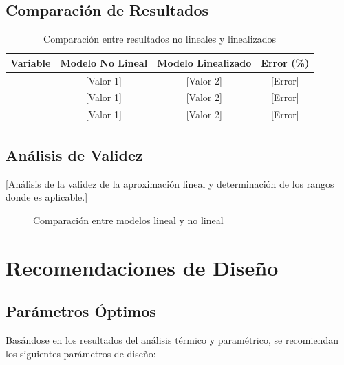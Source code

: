 \documentclass[12pt,letterpaper]{article}
\begin{document}
\subsection{Comparación de Resultados}
\begin{table}[H]
    \centering
    \caption{Comparación entre resultados no lineales y linealizados}
    \label{tab:comparacion_lineal}
    \begin{tabular}{lccc}
        \toprule
        \textbf{Variable} & \textbf{Modelo No Lineal} & \textbf{Modelo Linealizado} & \textbf{Error (\%)} \\
        \midrule
        [Variable 1] & [Valor 1] & [Valor 2] & [Error] \\
        [Variable 2] & [Valor 1] & [Valor 2] & [Error] \\
        [Variable 3] & [Valor 1] & [Valor 2] & [Error] \\
        \bottomrule
    \end{tabular}
\end{table}

\subsection{Análisis de Validez}
[Análisis de la validez de la aproximación lineal y determinación de los rangos donde es aplicable.]

\begin{figure}[H]
    \centering
    \caption{Comparación entre modelos lineal y no lineal}
    \label{fig:comparacion_lineal}
\end{figure}

\newpage
\section{Recomendaciones de Diseño}

\subsection{Parámetros Óptimos}
Basándose en los resultados del análisis térmico y paramétrico, se recomiendan los siguientes parámetros de diseño:
\end{document}
